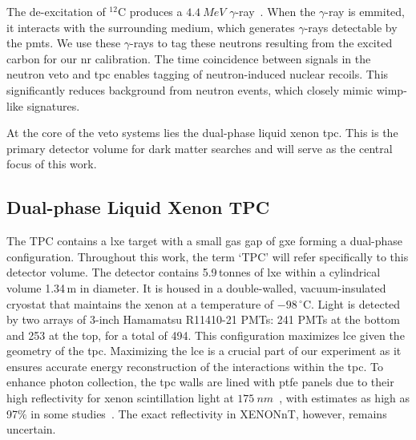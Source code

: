 The de-excitation of $^{12}\text{C}$ produces a $\SI{4.4}{MeV}$ $\gamma$-ray~\cite{ITO2023168701}. When the  $\gamma$-ray is emmited, it interacts with the surrounding medium, which generates $\gamma$-rays detectable by the \glspl{pmt}. We use these $\gamma$-rays to tag these neutrons resulting from the excited carbon for our \gls{nr} calibration. The time coincidence between signals in the neutron veto and \gls{tpc} enables tagging of neutron-induced nuclear recoils. This significantly reduces background from neutron events, which closely mimic \gls{wimp}-like signatures.

At the core of the veto systems lies the dual-phase liquid xenon \gls{tpc}. This is the primary detector volume for dark matter searches and will serve as the central focus of this work.

\subsection{Dual-phase Liquid Xenon TPC}


The TPC contains a \acrfull{lxe} target with a small gas gap of \acrfull{gxe} forming a dual-phase configuration. Throughout this work, the term ‘TPC’ will refer specifically to this detector volume. The detector contains 5.9\,tonnes of \gls{lxe} within a cylindrical volume 1.34\,m in diameter. It is housed in a double-walled, vacuum-insulated cryostat that maintains the xenon at a temperature of $-98\,^\circ$C.
Light is detected by two arrays of 3-inch Hamamatsu R11410-21 PMTs: 241 PMTs at the bottom and 253 at the top, for a total of 494. This configuration maximizes \acrfull{lce} given the geometry of the \gls{tpc}. Maximizing the \gls{lce} is a crucial part of our experiment as it ensures accurate energy reconstruction of the interactions within the \gls{tpc}. To enhance photon collection, the \gls{tpc} walls are lined with \acrfull{ptfe} panels due to their high reflectivity for xenon scintillation light at $\SI{175}{nm}$~\cite{FUJII2015293}, with estimates as high as 97$\%$ in some studies~\cite{Neves:2016tcw}. The exact reflectivity in XENONnT, however, remains uncertain.

